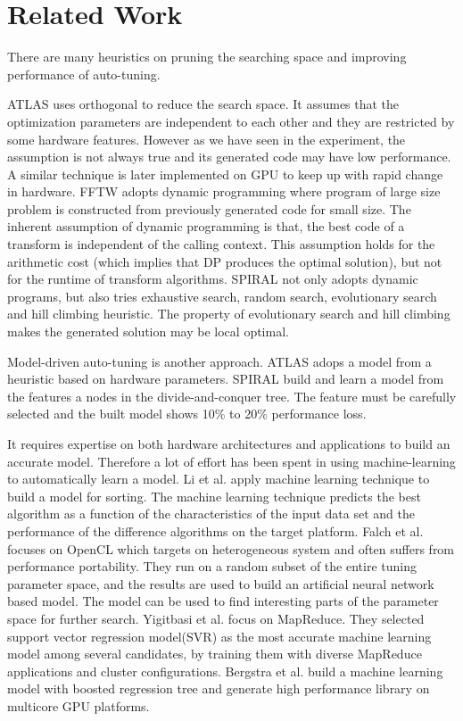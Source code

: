 \section{Related Work}
\label{sec:related}

There are many heuristics on pruning the searching space and improving performance of auto-tuning.

ATLAS\cite{yotov2005search} uses orthogonal to reduce the search space. It assumes that
the optimization parameters are independent to each other and they are restricted by some hardware features.
However as we have seen in the experiment, the assumption is not always true and its generated code
may have low performance. A similar technique \cite{li2009note} is later implemented on GPU to keep up
with rapid change in hardware. FFTW\cite{frigo2005design} adopts dynamic programming where program of large size problem
is constructed from previously generated code for small size. The inherent assumption of dynamic programming is that,
the best code of a transform is independent of the calling context. This assumption holds for the arithmetic cost (which implies
that DP produces the optimal solution), but not for the runtime of transform algorithms.
SPIRAL\cite{puschel2005spiral} not only adopts dynamic programs,
but also tries exhaustive search, random search, evolutionary search and hill climbing heuristic. The property
of evolutionary search and hill climbing makes the generated solution may be local optimal. \par

Model-driven auto-tuning is another approach. ATLAS\cite{yotov2005search} adops a model from a heuristic based on
hardware parameters. SPIRAL\cite{puschel2005spiral} build and learn a model from the features a nodes in the divide-and-conquer tree.
The feature must be carefully selected and the built model shows 10\% to 20\% performance loss. \par

It requires expertise on both hardware architectures and applications to build an accurate model. Therefore a lot of 
effort has been spent in using machine-learning to automatically learn a model. Li et al.\cite{li2004dynamically} apply machine learning
technique to build a model for sorting. The machine learning technique predicts the best algorithm as a function of the
characteristics of the input data set and the performance of the difference algorithms on the target platform. Falch et al.\cite{falch2015machine}
focuses on OpenCL which targets on heterogeneous system and often suffers from performance portability. They run on a random
subset of the entire tuning parameter space, and the results are used to build an artificial neural network based model.
The model can be used to find interesting parts of the parameter space for further search. Yigitbasi et al.\cite{yigitbasi2013towards} focus on MapReduce.
They selected support vector regression model(SVR) as the most accurate machine learning model among several candidates, by
training them with diverse MapReduce applications and cluster configurations. Bergstra et al.\cite{bergstra2012machine} build a machine learning model
with boosted regression tree and generate high performance library on multicore GPU platforms.
